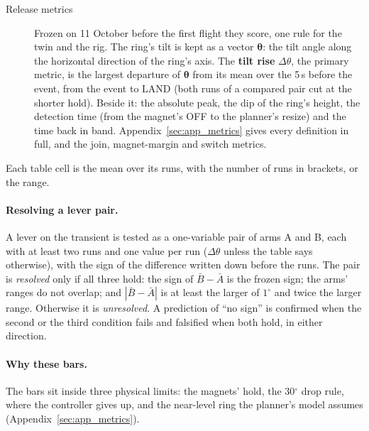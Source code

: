 \begin{description}
    \item[Release metrics] Frozen on 11 October before the first flight they score, one rule for the twin and the
    rig. The ring's tilt is kept as a vector $\boldsymbol{\theta}$: the tilt angle along the horizontal direction of the
    ring's axis. The \textbf{tilt rise} $\Delta\theta$, the primary metric, is the largest departure of
    $\boldsymbol{\theta}$ from its mean over the 5\,s before the event, from the event to LAND (both runs of a compared
    pair cut at the shorter hold). Beside it: the absolute peak, the dip of the ring's height, the detection time (from
    the magnet's OFF to the planner's resize) and the time back in band. Appendix~\ref{sec:app_metrics} gives every
    definition in full, and the join, magnet-margin and switch metrics.
\end{description}
Each table cell is the mean over its runs, with the number of runs in brackets, or the range.

\paragraph{Resolving a lever pair.} A lever on the transient is tested as a one-variable pair of arms A and B,
each with at least two runs and one value per run ($\Delta\theta$ unless the table says otherwise), with the
sign of the difference written down before the runs. The pair is \emph{resolved} only if all three hold: the
sign of $\bar{B}-\bar{A}$ is the frozen sign; the arms' ranges do not overlap; and $|\bar{B}-\bar{A}|$ is at
least the larger of $1^\circ$ and twice the larger range. Otherwise it is \emph{unresolved}. A prediction of
``no sign'' is confirmed when the second or the third condition fails and falsified when both hold, in either
direction. 

\paragraph{Why these bars.} The bars sit inside three physical limits: the magnets' hold, the 30$^\circ$ drop rule,
where the controller gives up, and the near-level ring the planner's model assumes (Appendix~\ref{sec:app_metrics}).
